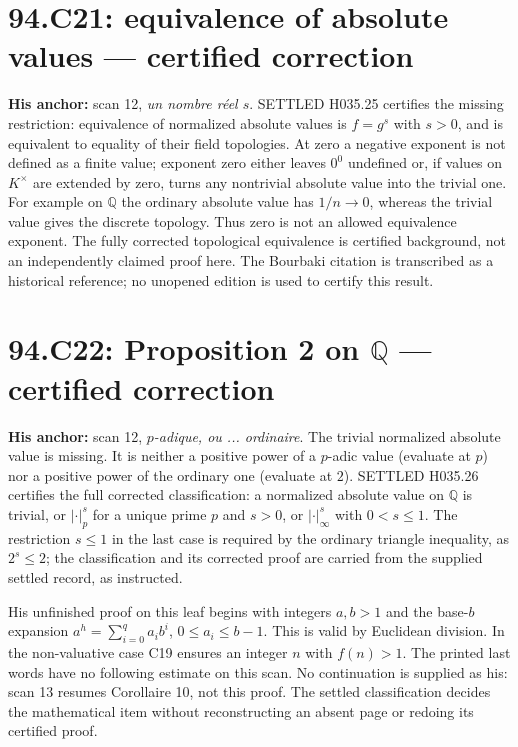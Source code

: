 \documentclass[11pt]{article}
\begin{document}
\section{94.C21: equivalence of absolute values --- certified correction}
\label{C21}
\textbf{His anchor:} scan 12, \emph{un nombre r\'eel $s$}.
SETTLED H035.25 certifies the missing restriction: equivalence of
normalized absolute values is $f=g^s$ with $s>0$, and is equivalent
to equality of their field topologies. At zero a negative exponent
is not defined as a finite value; exponent zero either leaves $0^0$
undefined or, if values on $K^\times$ are extended by zero, turns any
nontrivial absolute value into the trivial one. For example on
$\mathbb Q$ the ordinary absolute value has $1/n\to0$, whereas the
trivial value gives the discrete topology. Thus zero is not an allowed
equivalence exponent. The fully corrected topological equivalence
is certified background, not an independently claimed proof here.
The Bourbaki citation is transcribed as a historical reference; no
unopened edition is used to certify this result.

\section{94.C22: Proposition 2 on $\mathbb Q$ --- certified correction}
\label{C22}
\textbf{His anchor:} scan 12, \emph{$p$-adique, ou ... ordinaire}.
The trivial normalized absolute value is missing. It is neither a
positive power of a $p$-adic value (evaluate at $p$) nor a positive
power of the ordinary one (evaluate at $2$). SETTLED H035.26 certifies
the full corrected classification: a normalized absolute value on
$\mathbb Q$ is trivial, or $|\cdot|_p^s$ for a unique prime $p$ and
$s>0$, or $|\cdot|_\infty^s$ with $0<s\le1$. The restriction $s\le1$
in the last case is required by the ordinary triangle inequality,
as $2^s\le2$; the classification and its corrected proof are carried
from the supplied settled record, as instructed.

His unfinished proof on this leaf begins with integers $a,b>1$ and
the base-$b$ expansion $a^h=\sum_{i=0}^q a_i b^i$,
$0\le a_i\le b-1$. This is valid by Euclidean division. In the
non-valuative case C19 ensures an integer $n$ with $f(n)>1$.
The printed last words have no following estimate on this scan.
No continuation is supplied as his: scan 13 resumes Corollaire 10,
not this proof. The settled classification decides the mathematical
item without reconstructing an absent page or redoing its certified proof.
\end{document}
